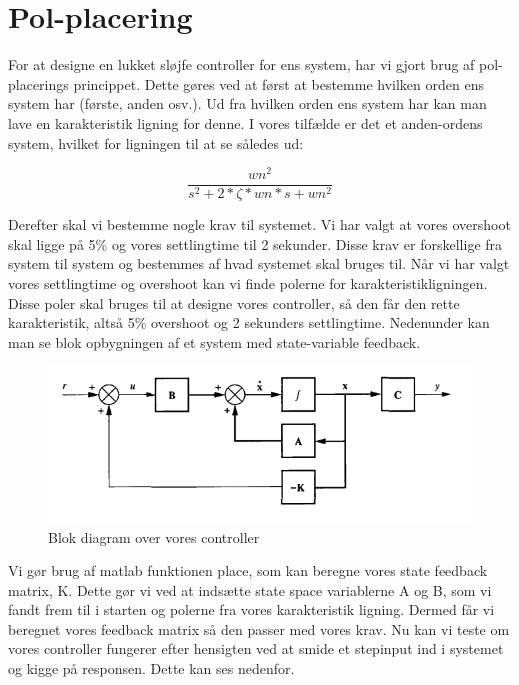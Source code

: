 \graphicspath{{Chapters/Pol-placering/}}

\section{Pol-placering}
For at designe en lukket sløjfe controller for ens system, har vi gjort brug af pol-placerings princippet. Dette gøres ved at først at bestemme hvilken orden ens system har (første, anden osv.). Ud fra hvilken orden ens system har kan man lave en karakteristik ligning for denne. I vores tilfælde er det et anden-ordens system, hvilket for ligningen til at se således ud:

\begin{equation}
 \frac{wn^2}{s^2+2*\zeta*wn*s+wn^2}
\end{equation}


Derefter skal vi bestemme nogle krav til systemet. Vi har valgt at vores overshoot skal ligge på 5\% og vores settlingtime til 2 sekunder. Disse krav er forskellige fra system til system og bestemmes af hvad systemet skal bruges til. Når vi har valgt vores settlingtime og overshoot kan vi finde polerne for karakteristikligningen. Disse poler skal bruges til at designe vores controller, så den får den rette karakteristik, altså 5\% overshoot og 2 sekunders settlingtime. Nedenunder kan man se blok opbygningen af et system med state-variable feedback.


\begin{figure}[H]
	\centering
	\includegraphics[width = 400pt]{Img/Controller_blok.png}
	\caption{Blok diagram over vores controller}
	\label{fig:Blok_CL}
\end{figure}

Vi gør brug af matlab funktionen place, som kan beregne vores state feedback matrix, K. Dette gør vi ved at indsætte state space variablerne A og B, som vi fandt frem til i starten og polerne fra vores karakteristik ligning. Dermed får vi beregnet vores feedback matrix så den passer med vores krav.
Nu kan vi teste om vores controller fungerer efter hensigten ved at smide et stepinput ind i systemet og kigge på responsen. Dette kan ses nedenfor.  

